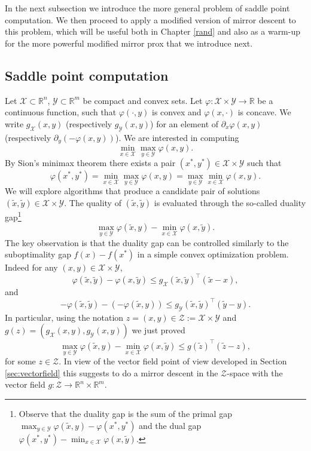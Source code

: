 \documentclass[openany]{now}
\newcommand{\tx}{\tilde{x}}
\newcommand{\ty}{\tilde{y}}
\newcommand{\tz}{\tilde{z}}
\renewcommand{\phi}{\varphi}
\newcommand{\R}{\mathbb{R}}
\newcommand{\cZ}{\mathcal{Z}}
\newcommand{\cX}{\mathcal{X}}
\newcommand{\cY}{\mathcal{Y}}
\renewcommand{\tilde}{\widetilde}
\begin{document}
In the next subsection we introduce the more general problem of saddle point computation. We then proceed to apply a modified version of mirror descent to this problem, which will be useful both in Chapter \ref{rand} and also as a warm-up for the more powerful modified mirror prox that we introduce next.

\subsection{Saddle point computation} \label{sec:sp}
Let $\cX \subset \R^n$, $\cY \subset \R^m$ be compact and convex sets. Let $\phi : \cX \times \cY \rightarrow \mathbb{R}$ be a continuous function, such that $\phi(\cdot, y)$ is convex and $\phi(x, \cdot)$ is concave. We write $g_{\cX}(x,y)$ (respectively $g_{\cY}(x,y)$) for an element of $\partial_x \phi(x,y)$ (respectively $\partial_y (-\phi(x,y))$). We are interested in computing
$$\min_{x \in \cX} \max_{y \in \cY} \phi(x,y) .$$
By Sion's minimax theorem there exists a pair $(x^*, y^*) \in \cX \times \cY$ such that
$$\phi(x^*,y^*) = \min_{x \in \mathcal{X}} \max_{y \in \mathcal{Y}} \phi(x,y) = \max_{y \in \mathcal{Y}} \min_{x \in \mathcal{X}} \phi(x,y) .$$
We will explore algorithms that produce a candidate pair of solutions $(\tx, \ty) \in \cX \times \cY$. The quality of $(\tx, \ty)$ is evaluated through the so-called duality gap\footnote{Observe that the duality gap is the sum of the primal gap $\max_{y \in \mathcal{Y}} \phi(\tx,y) - \phi(x^*,y^*)$ and the dual gap $\phi(x^*,y^*) - \min_{x \in \mathcal{X}} \phi(x, \ty)$.}
$$\max_{y \in \mathcal{Y}} \phi(\tx,y) - \min_{x \in \mathcal{X}} \phi(x,\ty) .$$
The key observation is that the duality gap can be controlled similarly to the suboptimality gap $f(x) - f(x^*)$ in a simple convex optimization problem. Indeed for any $(x, y) \in \cX \times \cY$,
$$\phi(\tx,\ty) - \phi(x,\ty) \leq g_{\cX}(\tx,\ty)^{\top} (\tx-x),$$
and 
$$- \phi(\tx,\ty) - (- \phi(\tx,y)) \leq g_{\cY}(\tx,\ty)^{\top} (\ty-y) .$$
In particular, using the notation $z = (x,y) \in \cZ := \cX \times \cY$ and $g(z) = (g_{\cX}(x,y), g_{\cY}(x,y))$ we just proved
\begin{equation} \label{eq:keysp}
\max_{y \in \mathcal{Y}} \phi(\tx,y) - \min_{x \in \mathcal{X}} \phi(x,\ty) \leq g(\tz)^{\top} (\tz - z) , 
\end{equation}
for some $z \in \mathcal{Z}.$ In view of the vector field point of view developed in Section \ref{sec:vectorfield} this suggests to do a mirror descent in the $\cZ$-space with the vector field $g : \cZ \rightarrow \R^n \times \R^m$. 
\end{document}
